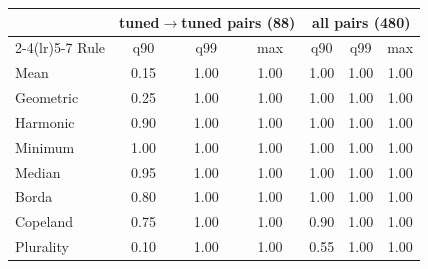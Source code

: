 \begin{tabular}{lcccccc}\toprule
 & \multicolumn{3}{c}{tuned$\to$tuned pairs (88)} & \multicolumn{3}{c}{all pairs (480)}\\\cmidrule(lr){2-4}\cmidrule(lr){5-7}
Rule & q90 & q99 & max & q90 & q99 & max\\\midrule
Mean & 0.15 & 1.00 & 1.00 & 1.00 & 1.00 & 1.00\\
Geometric & 0.25 & 1.00 & 1.00 & 1.00 & 1.00 & 1.00\\
Harmonic & 0.90 & 1.00 & 1.00 & 1.00 & 1.00 & 1.00\\
Minimum & 1.00 & 1.00 & 1.00 & 1.00 & 1.00 & 1.00\\
Median & 0.95 & 1.00 & 1.00 & 1.00 & 1.00 & 1.00\\
Borda & 0.80 & 1.00 & 1.00 & 1.00 & 1.00 & 1.00\\
Copeland & 0.75 & 1.00 & 1.00 & 0.90 & 1.00 & 1.00\\
Plurality & 0.10 & 1.00 & 1.00 & 0.55 & 1.00 & 1.00\\
\bottomrule\end{tabular}
